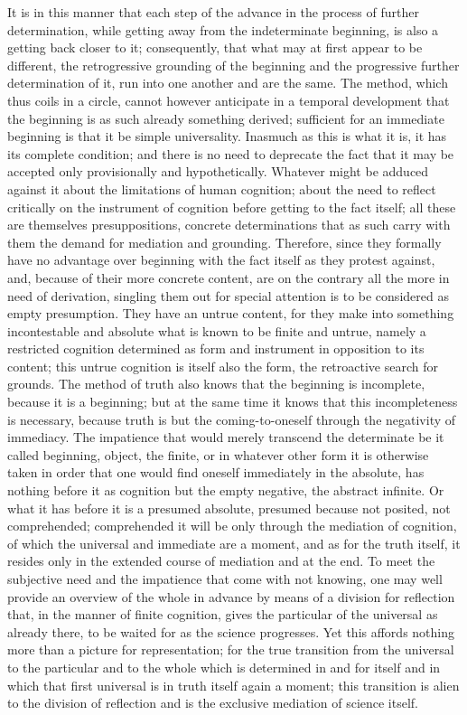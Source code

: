 It is in this manner that each step of the advance
in the process of further determination,
while getting away from the indeterminate beginning,
is also a getting back closer to it;
consequently, that what may at first appear to be different,
the retrogressive grounding of the beginning
and the progressive further determination of it,
run into one another and are the same.
The method, which thus coils in a circle,
cannot however anticipate in a temporal development
that the beginning is as such already something derived;
sufficient for an immediate beginning is that it be simple universality.
Inasmuch as this is what it is, it has its complete condition;
and there is no need to deprecate the fact that
it may be accepted only provisionally and hypothetically.
Whatever might be adduced against it about
the limitations of human cognition;
about the need to reflect critically
on the instrument of cognition
before getting to the fact itself;
all these are themselves presuppositions,
concrete determinations that as such carry
with them the demand for mediation and grounding.
Therefore, since they formally have no advantage
over beginning with the fact itself as they protest against,
and, because of their more concrete content,
are on the contrary all the more in need of derivation,
singling them out for special attention
is to be considered as empty presumption.
They have an untrue content, for they make into something
incontestable and absolute what is known to be finite and untrue,
namely a restricted cognition determined as form and instrument
in opposition to its content;
this untrue cognition is itself also the form,
the retroactive search for grounds.
The method of truth also knows that the beginning is incomplete,
because it is a beginning;
but at the same time it knows that
this incompleteness is necessary,
because truth is but the coming-to-oneself
through the negativity of immediacy.
The impatience that would merely transcend the determinate
be it called beginning, object, the finite,
or in whatever other form it is otherwise taken
in order that one would find oneself immediately in the absolute,
has nothing before it as cognition but the empty negative, the abstract infinite.
Or what it has before it is a presumed absolute,
presumed because not posited, not comprehended;
comprehended it will be only through the mediation of cognition,
of which the universal and immediate are a moment,
and as for the truth itself,
it resides only in the extended course of mediation and at the end.
To meet the subjective need and the impatience
that come with not knowing,
one may well provide an overview of the whole in advance
by means of a division for reflection that,
in the manner of finite cognition,
gives the particular of the universal as already there, to be waited
for as the science progresses.
Yet this affords nothing more than a picture
for representation;
for the true transition from the universal
to the particular and to the whole
which is determined in and for itself
and in which that first universal is in truth
itself again a moment;
this transition is alien to the division of reflection
and is the exclusive mediation of science itself.

